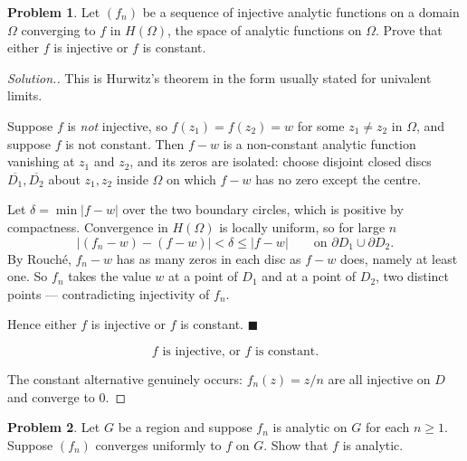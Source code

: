 \documentclass[11pt,a4paper]{article}
\theoremstyle{definition}
\newtheorem{problemx}{Problem}[section]
\newenvironment{problem}{\begin{problemx}}{\end{problemx}}
\newenvironment{solution}
  {\renewcommand{\qedsymbol}{}\begin{proof}[\textit{Solution}.]}
  {\end{proof}}
\begin{document}
\begin{problem}
Let $(f_n)$ be a sequence of injective analytic functions on a domain $\Omega$
converging to $f$ in $H(\Omega)$, the space of analytic functions on $\Omega$.
Prove that either $f$ is injective or $f$ is constant.
\end{problem}

\begin{solution}
This is Hurwitz's theorem in the form usually stated for univalent limits.

Suppose $f$ is \emph{not} injective, so $f(z_1) = f(z_2) = w$ for some
$z_1 \neq z_2$ in $\Omega$, and suppose $f$ is not constant. Then $f - w$ is a
non-constant analytic function vanishing at $z_1$ and $z_2$, and its zeros are
isolated: choose disjoint closed discs $\overline{D_1}, \overline{D_2}$ about
$z_1, z_2$ inside $\Omega$ on which $f - w$ has no zero except the centre.

Let $\delta = \min\left|f - w\right|$ over the two boundary circles, which is
positive by compactness. Convergence in $H(\Omega)$ is locally uniform, so for
large $n$
$$\left|\left(f_n - w\right) - \left(f - w\right)\right| < \delta
\leq \left|f-w\right| \qquad\text{on } \partial D_1 \cup \partial D_2 .$$
By Rouch\'e, $f_n - w$ has as many zeros in each disc as $f - w$ does, namely at
least one. So $f_n$ takes the value $w$ at a point of $D_1$ and at a point of
$D_2$, two distinct points --- contradicting injectivity of $f_n$.

Hence either $f$ is injective or $f$ is constant. $\blacksquare$

$$\boxed{f \text{ is injective, or } f \text{ is constant.}}$$

The constant alternative genuinely occurs: $f_n(z) = z/n$ are all injective on
$D$ and converge to $0$.
\end{solution}


\begin{problem}
Let $G$ be a region and suppose $f_n$ is analytic on $G$ for each $n \geq 1$.
Suppose $(f_n)$ converges uniformly to $f$ on $G$. Show that $f$ is analytic.
\end{problem}
\end{document}
